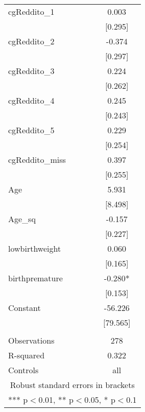\documentclass[]{article}
\begin{document}
\begin{tabular}{lc}
cgReddito\_1 & 0.003 \\
 & [0.295] \\
cgReddito\_2 & -0.374 \\
 & [0.297] \\
cgReddito\_3 & 0.224 \\
 & [0.262] \\
cgReddito\_4 & 0.245 \\
 & [0.243] \\
cgReddito\_5 & 0.229 \\
 & [0.254] \\
cgReddito\_miss & 0.397 \\
 & [0.255] \\
Age & 5.931 \\
 & [8.498] \\
Age\_sq & -0.157 \\
 & [0.227] \\
lowbirthweight & 0.060 \\
 & [0.165] \\
birthpremature & -0.280* \\
 & [0.153] \\
Constant & -56.226 \\
 & [79.565] \\
 &  \\
Observations & 278 \\
R-squared & 0.322 \\
 Controls & all \\ \hline
\multicolumn{2}{c}{ Robust standard errors in brackets} \\
\multicolumn{2}{c}{ *** p$<$0.01, ** p$<$0.05, * p$<$0.1} \\
\end{tabular}
\end{document}
